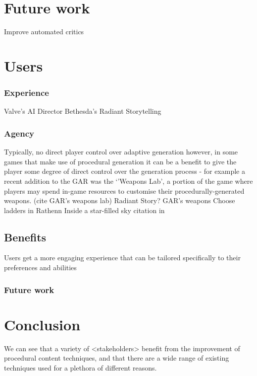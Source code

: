 \documentclass{acm_proc_article-sp}
\begin{document}
\section{Future work}
Improve automated critics \cite{hendrikx2012procedural}

\newpage
\section{Users}

\cite{sorenson2010towards}

\subsubsection{Experience}
Valve's AI Director \cite{valve}
Bethesda's Radiant Storytelling \cite{radiant}
\subsubsection{Agency}
Typically, no direct player control over adaptive generation \cite{hamlet}
however, in some games that make use of procedural generation it can be a benefit to give the player some degree of direct control over the generation process - for example a recent addition to the GAR was the `'Weapons Lab', a portion of the game where players may spend in-game resources to customise their procedurally-generated weapons. (cite GAR's weapons lab)
Radiant Story?
GAR's weapons
Choose ladders in Rathenn \cite{smith2011pcg}
Inside a star-filled sky citation in \cite{smith2011pcg}

\subsection{Benefits}
Users get a more engaging experience that can be tailored specifically to their preferences and abilities
\subsubsection{Future work}

\section{Conclusion}
We can see that a variety of <stakeholders> benefit from the improvement of procedural content techniques, and that there are a wide range of existing techniques used for a plethora of different reasons.

\newpage


\balancecolumns
\end{document}
